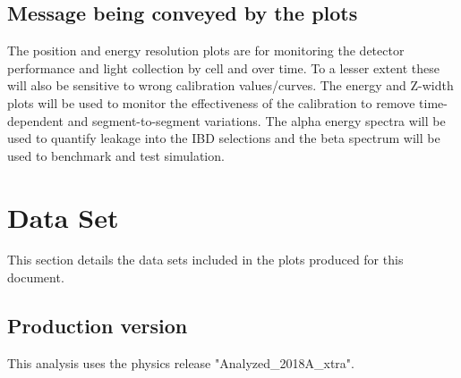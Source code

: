 \subsection{Message being conveyed by the plots}
The position and energy resolution plots are for monitoring the detector performance and light collection by cell and over time. To a lesser extent these will also be sensitive to wrong calibration values/curves. The energy and Z-width plots will be used to monitor the effectiveness of the calibration to remove time-dependent and segment-to-segment variations. The alpha energy spectra will be used to quantify leakage into the IBD selections and the beta spectrum will be used to benchmark and test simulation.

\section{Data Set}
This section details the data sets included in the plots produced for this document.
\subsection{Production version}
This analysis uses the physics release "Analyzed\_2018A\_xtra".
